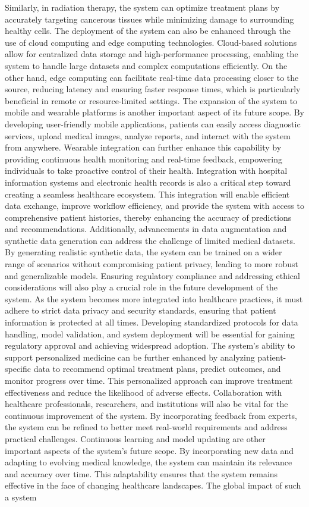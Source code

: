\documentclass[a4paper,12pt]{report}
\begin{document}
\begin{doublespace}
 Similarly, in radiation therapy, the system can optimize treatment plans by accurately targeting cancerous tissues while minimizing damage to surrounding healthy cells. The deployment of the system can also be enhanced through the use of cloud computing and edge computing technologies. Cloud-based solutions allow for centralized data storage and high-performance processing, enabling the system to handle large datasets and complex computations efficiently. On the other hand, edge computing can facilitate real-time data processing closer to the source, reducing latency and ensuring faster response times, which is particularly beneficial in remote or resource-limited settings. The expansion of the system to mobile and wearable platforms is another important aspect of its future scope. By developing user-friendly mobile applications, patients can easily access diagnostic services, upload medical images, analyze reports, and interact with the system from anywhere. Wearable integration can further enhance this capability by providing continuous health monitoring and real-time feedback, empowering individuals to take proactive control of their health. Integration with hospital information systems and electronic health records is also a critical step toward creating a seamless healthcare ecosystem. This integration will enable efficient data exchange, improve workflow efficiency, and provide the system with access to comprehensive patient histories, thereby enhancing the accuracy of predictions and recommendations. Additionally, advancements in data augmentation and synthetic data generation can address the challenge of limited medical datasets. By generating realistic synthetic data, the system can be trained on a wider range of scenarios without compromising patient privacy, leading to more robust and generalizable models. Ensuring regulatory compliance and addressing ethical considerations will also play a crucial role in the future development of the system. As the system becomes more integrated into healthcare practices, it must adhere to strict data privacy and security standards, ensuring that patient information is protected at all times. Developing standardized protocols for data handling, model validation, and system deployment will be essential for gaining regulatory approval and achieving widespread adoption. The system’s ability to support personalized medicine can be further enhanced by analyzing patient-specific data to recommend optimal treatment plans, predict outcomes, and monitor progress over time. This personalized approach can improve treatment effectiveness and reduce the likelihood of adverse effects. Collaboration with healthcare professionals, researchers, and institutions will also be vital for the continuous improvement of the system. By incorporating feedback from experts, the system can be refined to better meet real-world requirements and address practical challenges. Continuous learning and model updating are other important aspects of the system’s future scope. By incorporating new data and adapting to evolving medical knowledge, the system can maintain its relevance and accuracy over time. This adaptability ensures that the system remains effective in the face of changing healthcare landscapes. The global impact of such a system 
\end{doublespace}
\end{document}
